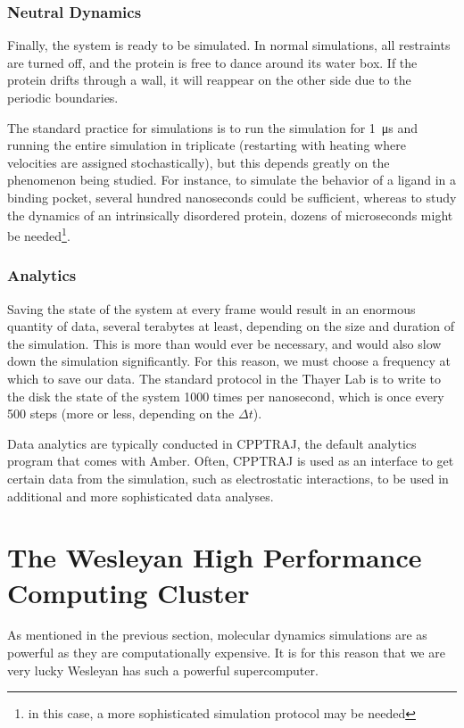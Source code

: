 \subsubsection{Neutral Dynamics}

Finally, the system is ready to be simulated. In normal simulations, all restraints are turned off, and the protein is free to dance around its water box. If the protein drifts through a wall, it will reappear on the other side due to the periodic boundaries.

The standard practice for simulations is to run the simulation for \qty{1}{\micro\second} and running the entire simulation in triplicate (restarting with heating where velocities are assigned stochastically), but this depends greatly on the phenomenon being studied. For instance, to simulate the behavior of a ligand in a binding pocket, several hundred nanoseconds could be sufficient, whereas to study the dynamics of an intrinsically disordered protein, dozens of microseconds might be needed\footnote{in this case, a more sophisticated simulation protocol may be needed}.

\subsubsection{Analytics}

Saving the state of the system at every frame would result in an enormous quantity of data, several terabytes at least, depending on the size and duration of the simulation. This is more than would ever be necessary, and would also slow down the simulation significantly. For this reason, we must choose a frequency at which to save our data. The standard protocol in the Thayer Lab is to write to the disk the state of the system \num{1000} times per nanosecond, which is once every \num{500} steps (more or less, depending on the \(\Delta t\)).

Data analytics are typically conducted in CPPTRAJ, the default analytics program that comes with Amber. Often, CPPTRAJ is used as an interface to get certain data from the simulation, such as electrostatic interactions, to be used in additional and more sophisticated data analyses.

\section{The Wesleyan High Performance Computing Cluster}

As mentioned in the previous section, molecular dynamics simulations are as powerful as they are computationally expensive. It is for this reason that we are very lucky Wesleyan has such a powerful supercomputer.

